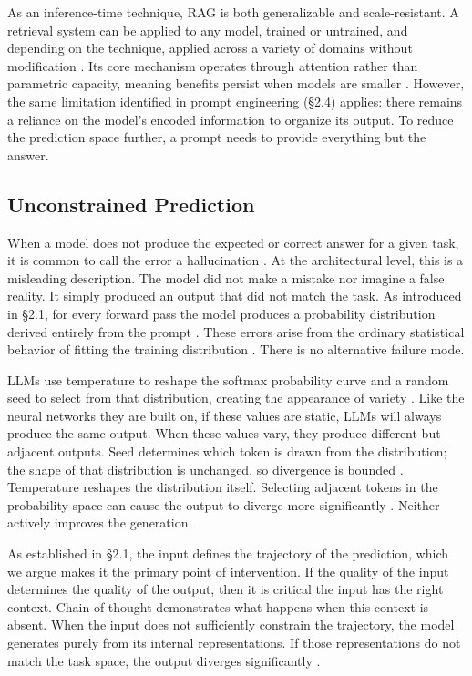 \documentclass{article}
\begin{document}
As an inference-time technique, RAG is both generalizable and scale-resistant. A retrieval system can be applied to any model, trained or untrained, and depending on the technique, applied across a variety of domains without modification \cite{rag_survey2023}. Its core mechanism operates through attention rather than parametric capacity, meaning benefits persist when models are smaller \cite{costofdownscaling2023}. However, the same limitation identified in prompt engineering (\S2.4) applies: there remains a reliance on the model's encoded information to organize its output. To reduce the prediction space further, a prompt needs to provide everything but the answer.

\subsection{Unconstrained Prediction}


When a model does not produce the expected or correct answer for a given task, it is common to call the error a hallucination \cite{ji2023hallucination, hallucination_unified2024}. At the architectural level, this is a misleading description. The model did not make a mistake nor imagine a false reality. It simply produced an output that did not match the task. As introduced in \S2.1, for every forward pass the model produces a probability distribution derived entirely from the prompt \cite{brown2020gpt3, llmreasoning_stochastic2024}. These errors arise from the ordinary statistical behavior of fitting the training distribution \cite{whyllmshallucinate2024}. There is no alternative failure mode.

LLMs use temperature to reshape the softmax probability curve and a random seed to select from that distribution, creating the appearance of variety \cite{temperature_impact2025}. Like the neural networks they are built on, if these values are static, LLMs will always produce the same output. When these values vary, they produce different but adjacent outputs. Seed determines which token is drawn from the distribution; the shape of that distribution is unchanged, so divergence is bounded \cite{seed_temperature_stability2025}. Temperature reshapes the distribution itself. Selecting adjacent tokens in the probability space can cause the output to diverge more significantly \cite{temperature_impact2025}. Neither actively improves the generation.

As established in \S2.1, the input defines the trajectory of the prediction, which we argue makes it the primary point of intervention. If the quality of the input determines the quality of the output, then it is critical the input has the right context. Chain-of-thought demonstrates what happens when this context is absent. When the input does not sufficiently constrain the trajectory, the model generates purely from its internal representations. If those representations do not match the task space, the output diverges significantly \cite{cot_degradation_slm2025, smallmodel_learnability2025}.
\end{document}
